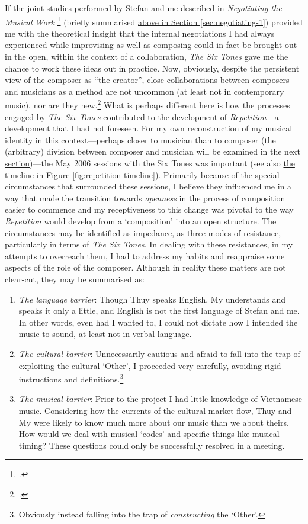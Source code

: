 If the joint studies performed by Stefan and me described in \emph{Negotiating the Musical Work} \footcite{frisk-ost06,frisk-ost06-2}  (briefly summarised \hyperref[sec:negotiating-1]{above in Section \ref*{sec:negotiating-1}}) provided me with the theoretical insight that the internal negotiations I had always experienced while improvising as well as composing could in fact be brought out in the open, within the context of a collaboration, \emph{The Six Tones} gave me the chance to work these ideas out in practice. Now, obviously, despite the persistent view of the composer as ``the creator'', close
collaborations between composers and musicians as a method are not uncommon (at least not in contemporary music), nor are they new.\footcite[For a PhD dissertation devoted to the subject, see][]{ostersjo08} What is perhaps different here is how the processes engaged by \emph{The Six Tones} contributed to the development of \emph{Repetition}---a development that I had not foreseen. For my own reconstruction of my musical identity in this context---perhaps closer to musician than to composer (the (arbitrary) division between composer and musician will be examined in the next \hyperref[sec:negotiating-3]{section})---the May 2006 sessions with the Six Tones was important (see also \hyperref[fig:repetition-timeline]{the timeline in Figure \ref*{fig:repetition-timeline}}). Primarily because of the special circumstances that surrounded these sessions, I believe they influenced me in a way that made the transition towards \emph{openness} in the process of composition easier to commence and my receptiveness to this change was pivotal to the way \emph{Repetition} would develop from a `composition' into an open structure. The circumstances may be identified as impedance, as three modes of resistance, particularly in terms of \emph{The Six Tones}. In dealing with these resistances, in my attempts to overreach them, I had to address my habits and reappraise some aspects of the role of the composer. Although in reality these matters are not clear-cut, they may be summarised as:
\begin{enumerate}[(1)]
\item \emph{The language barrier}: Though Thuy speaks English, My understands and speaks it only a little, and English is not the first language of Stefan and me. In other words, even had I wanted to, I could not dictate how I intended the music to sound, at least not in verbal language.
\item \emph{The cultural barrier}: Unnecessarily cautious and afraid to fall into the trap of exploiting the cultural `Other', I proceeded very carefully, avoiding rigid instructions and   definitions.\footnote{Obviously instead falling into the trap of \emph{constructing} the `Other'.}
\item \emph{The musical barrier}: Prior to the project I had little knowledge of Vietnamese music. Considering how the currents of the cultural market flow, Thuy and My were likely to know much more about our music than we about theirs. How would we deal with musical `codes' and specific things like musical timing? These questions could only be successfully resolved in a meeting.
\end{enumerate}

